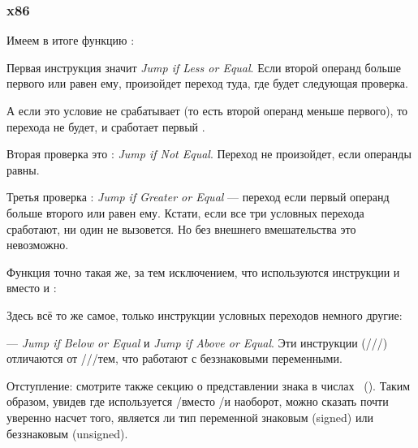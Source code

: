 \subsubsection{x86}


Имеем в итоге функцию :



Первая инструкция \JLE значит \emph{Jump if Less or Equal}. 
Если второй операнд больше первого или равен ему, произойдет переход туда, где будет следующая проверка.

А если это условие не срабатывает (то есть второй операнд меньше первого), то перехода не будет, 
и сработает первый \printf.

Вторая проверка это \JNE: \emph{Jump if Not Equal}.
Переход не произойдет, если операнды равны.

Третья проверка \JGE: \emph{Jump if Greater or Equal} --- переход 
если первый операнд больше второго или равен ему.
Кстати, если все три условных перехода сработают, ни один \printf не вызовется. 
Но без внешнего вмешательства это невозможно.

Функция  точно такая же, за тем исключением, что используются инструкции 
\JBE и \JAE вместо \JLE и \JGE:



Здесь всё то же самое, только инструкции условных переходов немного другие:

\JBE --- \emph{Jump if Below or Equal} и \JAE\EMDASH{}\emph{Jump if Above or Equal}.
Эти инструкции (\JA/\JAE/\JB/\JBE) 
отличаются от \JG/\JGE/\JL/\JLE тем, что работают с беззнаковыми переменными.

Отступление: смотрите также секцию о представлении знака в числах ~().
Таким образом, увидев где используется \JG/\JL вместо \JA/\JB и наоборот, 
можно сказать почти уверенно насчет того, 
является ли тип переменной знаковым (signed) или беззнаковым (unsigned).

